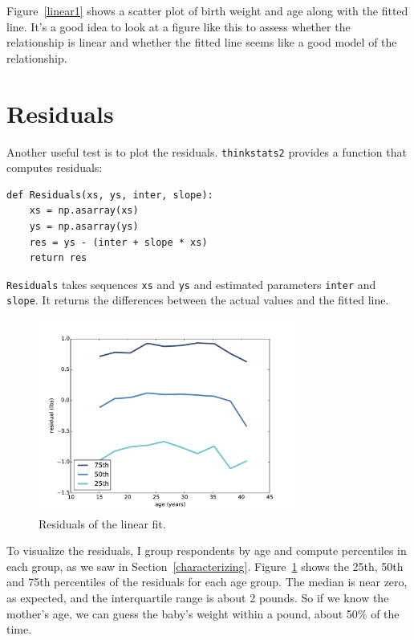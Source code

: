 \documentclass[12pt]{book}
\begin{document}
Figure~\ref{linear1} shows a scatter plot of birth weight and age
along with the fitted line.  It's a good idea to look at a figure like
this to assess whether the relationship is linear and whether the
fitted line seems like a good model of the relationship.


\section{Residuals}
\label{residuals}

Another useful test is to plot the residuals.
{\tt thinkstats2} provides a function that computes residuals:

\begin{verbatim}
def Residuals(xs, ys, inter, slope):
    xs = np.asarray(xs)
    ys = np.asarray(ys)
    res = ys - (inter + slope * xs)
    return res
\end{verbatim}

{\tt Residuals} takes sequences {\tt xs} and {\tt ys} and
estimated parameters {\tt inter} and {\tt slope}.  It returns
the differences between the actual values and the fitted line.

\begin{figure}
\centerline{\includegraphics[height=2.5in]{figs/linear2.pdf}}
\caption{Residuals of the linear fit.}
\label{linear2}
\end{figure}

To visualize the residuals, I group respondents by age and compute
percentiles in each group, as we saw in Section~\ref{characterizing}.
Figure~\ref{linear2} shows the 25th, 50th and 75th percentiles of
the residuals for each age group.  The median is near zero, as
expected, and the interquartile range is about 2 pounds.  So if we
know the mother's age, we can guess the baby's weight within a pound,
about 50\% of the time.
\end{document}
